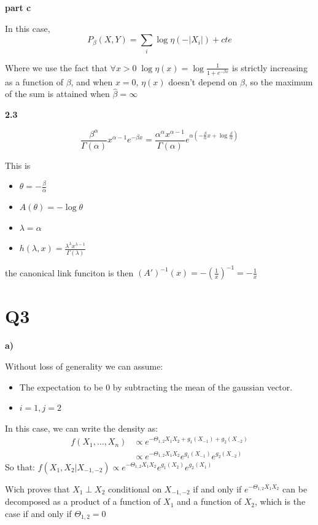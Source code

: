 \documentclass[11pt]{article}
\begin{document}
\textbf{part c}

In this case, $$P_{\beta}(X, Y) = \sum_i \log \eta(-|X_i|) + cte$$

Where we use the fact that \(\forall x > 0\;  \log \eta(x) =  \log \frac1{1+e^{-\beta x}}\) is strictly increasing as a function of \(\beta\), and when \(x = 0\), \(\eta(x)\) doesn't depend on \(\beta\), so the maximum of the sum is attained when \(\hat \beta = \infty\)


\textbf{2.3}

$$\frac{\beta^{\alpha}}{\Gamma(\alpha)} x^{\alpha-1} e^{-\beta x} = \frac{\alpha^{\alpha} x^{\alpha-1}}{\Gamma(\alpha)} e^{\alpha (-\frac{\beta}{\alpha} x +  \log \frac{\beta}{\alpha})}$$

This is
\begin{itemize}
\item \(\theta = -\frac\beta\alpha\)
\item \(A(\theta) = -\log \theta\)
\item \(\lambda = \alpha\)
\item \(h(\lambda, x) = \frac{\lambda^{\lambda} x^{\lambda-1}}{\Gamma(\lambda)}\)
\end{itemize}

the canonical link funciton is then \((A')^{-1}(x) = -(\frac 1x)^{-1} = -\frac 1x\)

\section{Q3}
\label{sec:orgheadline5}

\textbf{a)}

Without loss of generality we can assume:
\begin{itemize}
\item The expectation to be 0 by subtracting the mean of the gaussian vector.
\item \(i = 1, j = 2\)
\end{itemize}

In this case, we can write the density as:
\begin{align*}
f(X_1, \ldots, X_n)
&\propto e^{-\Theta_{1,2}X_1X_2  + g_1(X_{-1}) + g_2(X_{-2})}
\\&\propto e^{-\Theta_{1,2}X_1X_2} e^{g_1(X_{-1})}e^{g_2(X_{-2})} 
\end{align*}
So that:
\(f(X_1, X_2 | X_{-1, -2}) \propto e^{-\Theta_{1,2}X_1X_2} e^{g_1(X_2)} e^{g_2(X_1)}\)

Wich proves that \(X_1 \perp X_2\) conditional on \(X_{-1, -2}\) if and only if \(e^{-\Theta_{1,2}X_1X_2}\) can be decomposed as a product of a function of \(X_1\) and a function of \(X_2\), which is the case if and only if \(\Theta_{1,2} = 0\)
\end{document}
